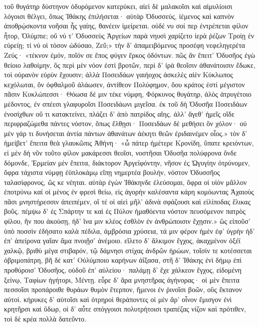 τοῦ θυγάτηρ δύστηνον ὀδυρόμενον κατερύκει,
αἰεὶ δὲ μαλακοῖσι καὶ αἱμυλίοισι λόγοισι
θέλγει, ὅπως Ἰθάκης ἐπιλήσεται· αὐτὰρ Ὀδυσσεύς,
ἱέμενος καὶ καπνὸν ἀποθρῴσκοντα νοῆσαι
ἧς γαίης, θανέειν ἱμείρεται. οὐδέ νυ σοί περ
ἐντρέπεται φίλον ἦτορ, Ὀλύμπιε; οὔ νύ τ' Ὀδυσσεὺς    
Ἀργείων παρὰ νηυσὶ χαρίζετο ἱερὰ ῥέζων
Τροίῃ ἐν εὐρείῃ; τί νύ οἱ τόσον ὠδύσαο, Ζεῦ;»
\nstanza
τὴν δ' ἀπαμειβόμενος προσέφη νεφεληγερέτα Ζεύς·
«τέκνον ἐμόν, ποῖόν σε ἔπος φύγεν ἕρκος ὀδόντων.
πῶς ἂν ἔπειτ' Ὀδυσῆος ἐγὼ θείοιο λαθοίμην,
ὃς περὶ μὲν νόον ἐστὶ βροτῶν, περὶ δ' ἱρὰ θεοῖσιν
ἀθανάτοισιν ἔδωκε, τοὶ οὐρανὸν εὐρὺν ἔχουσιν;
ἀλλὰ Ποσειδάων γαιήοχος ἀσκελὲς αἰὲν
Κύκλωπος κεχόλωται, ὃν ὀφθαλμοῦ ἀλάωσεν,
ἀντίθεον Πολύφημον, ὅου κράτος ἐστὶ μέγιστον    
πᾶσιν Κυκλώπεσσι· Θόωσα δέ μιν τέκε νύμφη,
Φόρκυνος θυγάτηρ, ἁλὸς ἀτρυγέτοιο μέδοντος,
ἐν σπέεσι γλαφυροῖσι Ποσειδάωνι μιγεῖσα.
ἐκ τοῦ δὴ Ὀδυσῆα Ποσειδάων ἐνοσίχθων
οὔ τι κατακτείνει, πλάζει δ' ἀπὸ πατρίδος αἴης.
ἀλλ' ἄγεθ' ἡμεῖς οἵδε περιφραζώμεθα πάντες
νόστον, ὅπως ἔλθῃσι· Ποσειδάων δὲ μεθήσει
ὃν χόλον· οὐ μὲν γάρ τι δυνήσεται ἀντία πάντων
ἀθανάτων ἀέκητι θεῶν ἐριδαινέμεν οἶος.»
\nstanza
τὸν δ' ἠμείβετ' ἔπειτα θεὰ γλαυκῶπις Ἀθήνη·    
«ὦ πάτερ ἡμέτερε Κρονίδη, ὕπατε κρειόντων,
εἰ μὲν δὴ νῦν τοῦτο φίλον μακάρεσσι θεοῖσι,
νοστῆσαι Ὀδυσῆα πολύφρονα ὅνδε δόμονδε,
Ἑρμείαν μὲν ἔπειτα, διάκτορον Ἀργεϊφόντην,
νῆσον ἐς Ὠγυγίην ὀτρύνομεν, ὄφρα τάχιστα
νύμφῃ ἐϋπλοκάμῳ εἴπῃ νημερτέα βουλήν,
νόστον Ὀδυσσῆος ταλασίφρονος, ὥς κε νέηται.
αὐτὰρ ἐγὼν Ἰθάκηνδε ἐλεύσομαι, ὄφρα οἱ υἱὸν
μᾶλλον ἐποτρύνω καί οἱ μένος ἐν φρεσὶ θείω,
εἰς ἀγορὴν καλέσαντα κάρη κομόωντας Ἀχαιοὺς    
πᾶσι μνηστήρεσσιν ἀπειπέμεν, οἵ τέ οἱ αἰεὶ
μῆλ' ἁδινὰ σφάζουσι καὶ εἰλίποδας ἕλικας βοῦς.
πέμψω δ' ἐς Σπάρτην τε καὶ ἐς Πύλον ἠμαθόεντα
νόστον πευσόμενον πατρὸς φίλου, ἤν που ἀκούσῃ,
ἠδ' ἵνα μιν κλέος ἐσθλὸν ἐν ἀνθρώποισιν ἔχῃσιν.»
\nstanza
ὣς εἰποῦσ' ὑπὸ ποσσὶν ἐδήσατο καλὰ πέδιλα,
ἀμβρόσια χρύσεια, τά μιν φέρον ἠμὲν ἐφ' ὑγρὴν
ἠδ' ἐπ' ἀπείρονα γαῖαν ἅμα πνοιῇσ' ἀνέμοιο.
εἵλετο δ' ἄλκιμον ἔγχος, ἀκαχμένον ὀξέϊ χαλκῷ,
βριθὺ μέγα στιβαρόν, τῷ δάμνησι στίχας ἀνδρῶν    
ἡρώων, τοῖσίν τε κοτέσσεται ὀβριμοπάτρη,
βῆ δὲ κατ' Οὐλύμποιο καρήνων ἀΐξασα,
στῆ δ' Ἰθάκης ἐνὶ δήμῳ ἐπὶ προθύροισ' Ὀδυσῆος,
οὐδοῦ ἐπ' αὐλείου· παλάμῃ δ' ἔχε χάλκεον ἔγχος,
εἰδομένη ξείνῳ, Ταφίων ἡγήτορι, Μέντῃ.
εὗρε δ' ἄρα μνηστῆρας ἀγήνορας· οἱ μὲν ἔπειτα
πεσσοῖσι προπάροιθε θυράων θυμὸν ἔτερπον,
ἥμενοι ἐν ῥινοῖσι βοῶν, οὓς ἔκτανον αὐτοί.
κήρυκες δ' αὐτοῖσι καὶ ὀτρηροὶ θεράποντες
οἱ μὲν ἄρ' οἶνον ἔμισγον ἐνὶ κρητῆρσι καὶ ὕδωρ,    
οἱ δ' αὖτε σπόγγοισι πολυτρήτοισι τραπέζας
νίζον καὶ πρότιθεν, τοὶ δὲ κρέα πολλὰ δατεῦντο.
\nstanza

